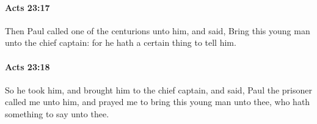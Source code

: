 		\paragraph{Acts 23:17} %
			\label{ACTS-23-17}

			Then Paul called one of the centurions unto him, and said, Bring this young man unto the chief captain: for he hath a certain thing to tell him.

			\begin{framed}
			\scriptsize
				\begin{compactdesc}
					\item[SBLG] 
				\end{compactdesc}
			\end{framed}

		\paragraph{Acts 23:18} %
			\label{ACTS-23-18}

			So he took him, and brought him to the chief captain, and said, Paul the prisoner called me unto him, and prayed me to bring this young man unto thee, who hath something to say unto thee.

